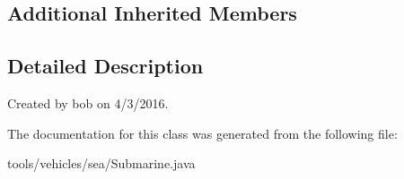 \subsection*{Additional Inherited Members}


\subsection{Detailed Description}
Created by bob on 4/3/2016. 

The documentation for this class was generated from the following file\+:\begin{DoxyCompactItemize}
\item 
tools/vehicles/sea/Submarine.\+java\end{DoxyCompactItemize}
